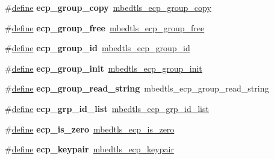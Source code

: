 \begin{DoxyCompactItemize}
\#\hyperlink{structdefine}{define} {\bfseries ecp\+\_\+group\+\_\+copy}~\hyperlink{ecp_8h_a2b6e780826b5d6ba4fd5dd5911e490dc}{mbedtls\+\_\+ecp\+\_\+group\+\_\+copy}
\item 
\mbox{\label{compat-1_83_8h_a38f54ea99a5c9b90d33387eb82cf697f}} 
\#\hyperlink{structdefine}{define} {\bfseries ecp\+\_\+group\+\_\+free}~\hyperlink{ecp_8h_a97b130596caa2844282181082f66cb90}{mbedtls\+\_\+ecp\+\_\+group\+\_\+free}
\item 
\mbox{\label{compat-1_83_8h_a2edc38cec015e67dd46fe8414101cea7}} 
\#\hyperlink{structdefine}{define} {\bfseries ecp\+\_\+group\+\_\+id}~\hyperlink{ecp_8h_af79e530ea8f8416480f805baa20b1a2d}{mbedtls\+\_\+ecp\+\_\+group\+\_\+id}
\item 
\mbox{\label{compat-1_83_8h_ae7d84e9bd6aa5e5e07da9f699b6b963d}} 
\#\hyperlink{structdefine}{define} {\bfseries ecp\+\_\+group\+\_\+init}~\hyperlink{ecp_8h_a5102f6d44d9f16aece7b2e685c31e5da}{mbedtls\+\_\+ecp\+\_\+group\+\_\+init}
\item 
\mbox{\label{compat-1_83_8h_a96f0cdec73fe28076bc0e1460b53de33}} 
\#\hyperlink{structdefine}{define} {\bfseries ecp\+\_\+group\+\_\+read\+\_\+string}~mbedtls\+\_\+ecp\+\_\+group\+\_\+read\+\_\+string
\item 
\mbox{\label{compat-1_83_8h_aea8abce2a8e2035ff67663be72f0be4c}} 
\#\hyperlink{structdefine}{define} {\bfseries ecp\+\_\+grp\+\_\+id\+\_\+list}~\hyperlink{ecp_8h_a84d2fed0c0cdde5201451bb5461aa275}{mbedtls\+\_\+ecp\+\_\+grp\+\_\+id\+\_\+list}
\item 
\mbox{\label{compat-1_83_8h_adab7d6d13495d5c8589b75ba97aabb7d}} 
\#\hyperlink{structdefine}{define} {\bfseries ecp\+\_\+is\+\_\+zero}~\hyperlink{ecp_8h_a17c7d8f0ee985c2ea5713659eccfd955}{mbedtls\+\_\+ecp\+\_\+is\+\_\+zero}
\item 
\mbox{\label{compat-1_83_8h_a7591d6eee6173ca27e2df41c656ac6a1}} 
\#\hyperlink{structdefine}{define} {\bfseries ecp\+\_\+keypair}~\hyperlink{structmbedtls__ecp__keypair}{mbedtls\+\_\+ecp\+\_\+keypair}
\item 
\mbox{\label{compat-1_83_8h_a5c3a58b7b743b9a7ee890deac36b6a4f}} 

\end{DoxyCompactItemize}
